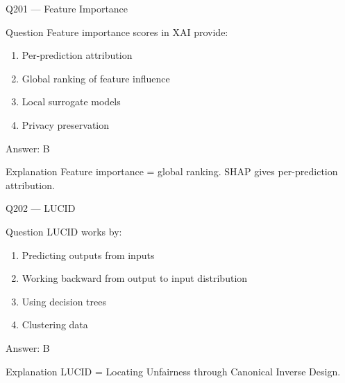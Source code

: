 \documentclass[aspectratio=169,8pt]{beamer}
\begin{document}
								\begin{frame}{Q201 --- Feature Importance}
									\begin{block}{Question}
										Feature importance scores in XAI provide:
										\begin{enumerate}
											\item Per-prediction attribution
											\item Global ranking of feature influence
											\item Local surrogate models
											\item Privacy preservation
										\end{enumerate}
									\end{block}
									\begin{exampleblock}{Answer: B}\end{exampleblock}
									\begin{block}{Explanation}
										Feature importance = global ranking. SHAP gives per-prediction attribution.
									\end{block}
								\end{frame}
								
								\begin{frame}{Q202 --- LUCID}
									\begin{block}{Question}
										LUCID works by:
										\begin{enumerate}
											\item Predicting outputs from inputs
											\item Working backward from output to input distribution
											\item Using decision trees
											\item Clustering data
										\end{enumerate}
									\end{block}
									\begin{exampleblock}{Answer: B}\end{exampleblock}
									\begin{block}{Explanation}
										LUCID = Locating Unfairness through Canonical Inverse Design.
									\end{block}
								\end{frame}
								
\end{document}
